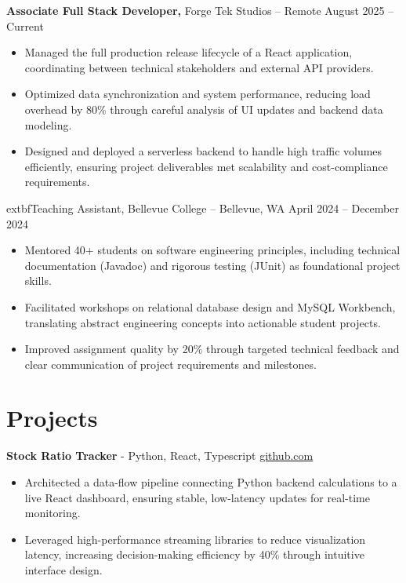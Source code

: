 \documentclass[11pt]{article}       %
\begin{document}
	\textbf{Associate Full Stack Developer,} {Forge Tek Studios} -- Remote \hfill August 2025 -- Current 
\vspace{-9pt}
\begin{itemize}
  \item Managed the full production release lifecycle of a React application, coordinating between technical stakeholders and external API providers.
  \item Optimized data synchronization and system performance, reducing load overhead by 80\% through careful analysis of UI updates and backend data modeling.
  \item Designed and deployed a serverless backend to handle high traffic volumes efficiently, ensuring project deliverables met scalability and cost-compliance requirements.
\end{itemize}

	extbf{Teaching Assistant,} {Bellevue College} -- Bellevue, WA \hfill April 2024 -- December 2024 
\vspace{-9pt}
\begin{itemize}
  \item Mentored 40+ students on software engineering principles, including technical documentation (Javadoc) and rigorous testing (JUnit) as foundational project skills.
  \item Facilitated workshops on relational database design and MySQL Workbench, translating abstract engineering concepts into actionable student projects.
  \item Improved assignment quality by 20\% through targeted technical feedback and clear communication of project requirements and milestones.
\end{itemize}

\vspace{-18.5pt}

\section*{Projects}

	\textbf{Stock Ratio Tracker}{ - Python, React, Typescript} \hfill \href{https://github.com/Monica20030707/tradingDashboard-UI}{github.com} 
\vspace{-9pt}
\begin{itemize}
  \item Architected a data-flow pipeline connecting Python backend calculations to a live React dashboard, ensuring stable, low-latency updates for real-time monitoring.
  \item Leveraged high-performance streaming libraries to reduce visualization latency, increasing decision-making efficiency by 40\% through intuitive interface design.
\end{itemize}
\end{document}
